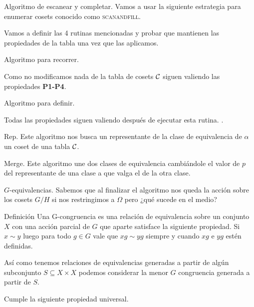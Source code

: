 \documentclass[aspectratio=169, 9pt]{beamer}
\newcommand{\scanfill}{\textsc{scanandfill}}
\newcommand{\Co}{\cal{C}}
\begin{document}
\begin{frame}[fragile]{Algoritmo de escanear y completar.}
	Vamos a usar la siguiente estrategia para enumerar cosets conocido como \scanfill.
	\pause
	
	
	
	\pause
	Vamos a definir las 4 rutinas mencionadas y probar que mantienen las propiedades de la tabla una vez que las aplicamos.
\end{frame}


\begin{frame}[fragile]{Algoritmo para recorrer.}
	
	
	Como no modificamos nada de la tabla de cosets $\Co$ siguen valiendo las propiedades \textbf{P1-P4}.
\end{frame}


\begin{frame}[fragile]{Algoritmo para definir.}
	
	
	Todas las propiedades siguen valiendo después de ejecutar esta rutina.
		.
\end{frame}

\begin{frame}[fragile]{Rep.}
	Este algoritmo nos busca un representante de la clase de equivalencia de $\alpha$ un coset de una tabla $\Co$.
	
	
\end{frame}

\begin{frame}[fragile]{Merge.}
	Este algoritmo une dos clases de equivalencia cambiándole el valor de $p$ del representante de una clase a que valga el de la otra clase.	
\end{frame}

\begin{frame}[fragile]{$G$-equivalencias.}
	Sabemos que al finalizar el algoritmo nos queda la acción sobre los cosets $G/H$ si nos restringimos a $\Omega$ pero ¿qué sucede en el medio?
	\pause
	
	
	\begin{alertblock}{Definición}
		Una \alert{G-congruencia} es una relación de equivalencia sobre un conjunto $X$ con una acción parcial de $G$ que aparte satisface la siguiente propiedad.
		Si $x \sim y$ luego para todo $g \in G$  vale que $xg \sim yg$ siempre y cuando $xg$ e $yg$ estén definidas.
	\end{alertblock}
	\pause
	
	
	
	Así como tenemos relaciones de equivalencias generadas a partir de algún subconjunto $S \subseteq X \times X$ podemos considerar la menor $G$ congruencia generada a partir de $S$.
	
	
	
	\pause
	
	Cumple la siguiente propiedad universal.
	
\end{frame}
\end{document}
